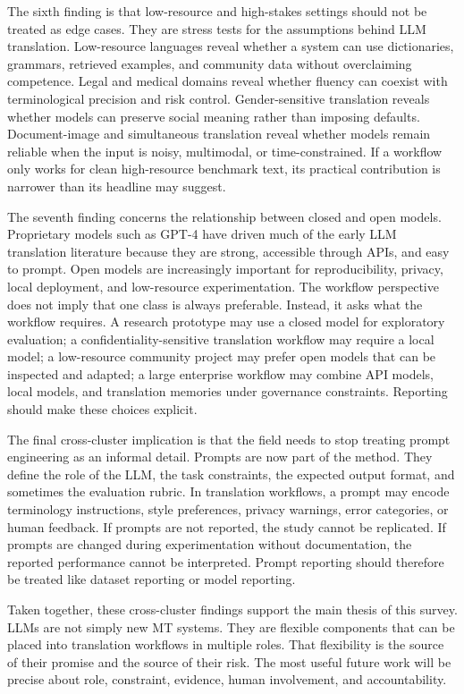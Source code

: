 \documentclass[11pt]{article}
\begin{document}
The sixth finding is that low-resource and high-stakes settings should not be treated as edge cases. They are stress tests for the assumptions behind LLM translation. Low-resource languages reveal whether a system can use dictionaries, grammars, retrieved examples, and community data without overclaiming competence. Legal and medical domains reveal whether fluency can coexist with terminological precision and risk control. Gender-sensitive translation reveals whether models can preserve social meaning rather than imposing defaults. Document-image and simultaneous translation reveal whether models remain reliable when the input is noisy, multimodal, or time-constrained. If a workflow only works for clean high-resource benchmark text, its practical contribution is narrower than its headline may suggest.

The seventh finding concerns the relationship between closed and open models. Proprietary models such as GPT-4 have driven much of the early LLM translation literature because they are strong, accessible through APIs, and easy to prompt. Open models are increasingly important for reproducibility, privacy, local deployment, and low-resource experimentation. The workflow perspective does not imply that one class is always preferable. Instead, it asks what the workflow requires. A research prototype may use a closed model for exploratory evaluation; a confidentiality-sensitive translation workflow may require a local model; a low-resource community project may prefer open models that can be inspected and adapted; a large enterprise workflow may combine API models, local models, and translation memories under governance constraints. Reporting should make these choices explicit.

The final cross-cluster implication is that the field needs to stop treating prompt engineering as an informal detail. Prompts are now part of the method. They define the role of the LLM, the task constraints, the expected output format, and sometimes the evaluation rubric. In translation workflows, a prompt may encode terminology instructions, style preferences, privacy warnings, error categories, or human feedback. If prompts are not reported, the study cannot be replicated. If prompts are changed during experimentation without documentation, the reported performance cannot be interpreted. Prompt reporting should therefore be treated like dataset reporting or model reporting.

Taken together, these cross-cluster findings support the main thesis of this survey. LLMs are not simply new MT systems. They are flexible components that can be placed into translation workflows in multiple roles. That flexibility is the source of their promise and the source of their risk. The most useful future work will be precise about role, constraint, evidence, human involvement, and accountability.
\end{document}
